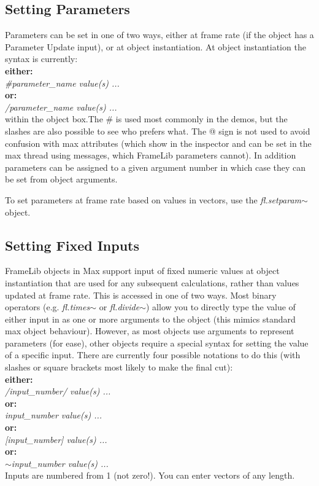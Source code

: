 \documentclass{article}
\newcommand{\flobject}[1]{\textit{fl.#1$\sim$}}
\begin{document}
\subsection{\label{sec:setparams}Setting Parameters}

Parameters can be set in one of two ways, either at frame rate (if the object has a Parameter Update input), or at object instantiation. At object instantiation the syntax is currently: \\ \textbf{either:}\\ 
\-\hspace{4ex} \textit{\#parameter\_name value(s) ...} \\ 
\textbf{or:}\\ 
\-\hspace{4ex} \textit{/parameter\_name value(s) ...} \\ 
within the object box.The \# is used most commonly in the demos, but the slashes are also possible to see who prefers what. The @ sign is not used to avoid confusion with max attributes (which show in the inspector and can be set in the max thread using messages, which FrameLib parameters cannot). In addition parameters can be assigned to a given argument number in which case they can be set from object arguments.

To set parameters at frame rate based on values in vectors, use the \flobject{setparam} object.

\subsection{Setting Fixed Inputs}

FrameLib objects in Max support input of fixed numeric values at object instantiation that are used for any subsequent calculations, rather than values updated at frame rate. This is accessed in one of two ways. Most binary operators (e.g. \flobject{times} or \flobject{divide}) allow you to directly type the value of either input in as one or more arguments to the object (this mimics standard max object behaviour). However, as most objects use arguments to represent parameters (for ease), other objects require a special syntax for setting the value of a specific input. There are currently four possible notations to do this (with slashes or square brackets most likely to make the final cut):\\
\textbf{either:}\\ 
\-\hspace{4ex} \textit{/input\_number/ value(s) ...} \\ 
\textbf{or:}\\ 
\-\hspace{4ex} \textit{\textlangle input\_number\textrangle{} value(s) ...} \\ 
\textbf{or:}\\ 
\-\hspace{4ex} \textit{[input\_number] value(s) ...} \\ 
\textbf{or:}\\ 
\-\hspace{4ex} \textit{$\sim$input\_number value(s) ...} \\ 
Inputs are numbered from 1 (not zero!). You can enter vectors of any length.
\end{document}
